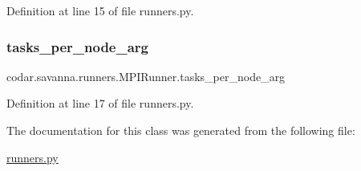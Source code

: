 Definition at line 15 of file runners.\+py.

\mbox{\label{classcodar_1_1savanna_1_1runners_1_1_m_p_i_runner_a58bd05be3e876f5a8f2522262ba934f7}} 
\subsubsection{\texorpdfstring{tasks\+\_\+per\+\_\+node\+\_\+arg}{tasks\_per\_node\_arg}}
{\footnotesize\ttfamily codar.\+savanna.\+runners.\+M\+P\+I\+Runner.\+tasks\+\_\+per\+\_\+node\+\_\+arg}



Definition at line 17 of file runners.\+py.



The documentation for this class was generated from the following file\+:\begin{DoxyCompactItemize}
\item 
\hyperlink{runners_8py}{runners.\+py}\end{DoxyCompactItemize}
